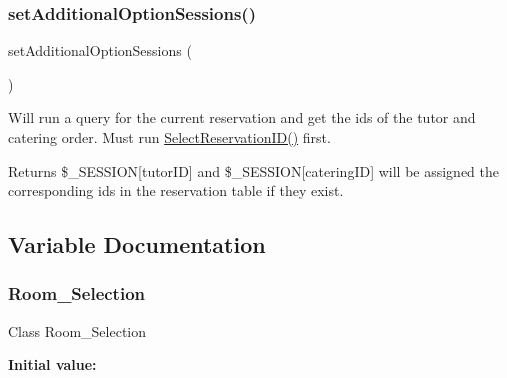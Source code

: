 \subsubsection{\texorpdfstring{setAdditionalOptionSessions()}{setAdditionalOptionSessions()}}
{\footnotesize\ttfamily set\+Additional\+Option\+Sessions (\begin{DoxyParamCaption}{ }\end{DoxyParamCaption})}

Will run a query for the current reservation and get the ids of the tutor and catering order. Must run \mbox{\hyperlink{_room___selection_8class_8php_a844d4eb0022335945cf36729cbeee645}{Select\+Reservation\+I\+D()}} first. \begin{DoxyReturn}{Returns}
\$\+\_\+\+S\+E\+S\+S\+I\+ON\mbox{[}\textquotesingle{}tutor\+ID\textquotesingle{}\mbox{]} and \$\+\_\+\+S\+E\+S\+S\+I\+ON\mbox{[}\textquotesingle{}catering\+ID\textquotesingle{}\mbox{]} will be assigned the corresponding ids in the reservation table if they exist. 
\end{DoxyReturn}


\subsection{Variable Documentation}
\mbox{\label{_room___selection_8class_8php_a6a9e0231c1dcb7e02782a437b45af63a}} 
\subsubsection{\texorpdfstring{Room\_Selection}{Room\_Selection}}
{\footnotesize\ttfamily Class Room\+\_\+\+Selection}

{\bfseries Initial value\+:}
\begin{DoxyCode}{0}
\DoxyCodeLine{\{}

\end{DoxyCode}

